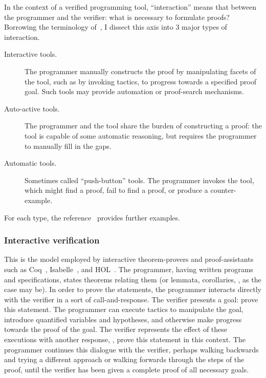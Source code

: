 In the context of a verified programming tool, ``interaction'' means that
between the programmer and the verifier: what is necessary to formulate proofs?
Borrowing the terminology of~\cite[\S 2]{Nelson_2019}, I dissect this axis into
3 major types of interaction.
\begin{description}
    \item[Interactive tools.] The programmer manually constructs the proof by
        manipulating facets of the tool, such as by invoking tactics, to
        progress towards a specified proof goal. Such tools may provide
        automation or proof-search mechanisms.
    \item[Auto-active tools.] The programmer and the tool share the burden of
        constructing a proof: the tool is capable of some automatic reasoning,
        but requires the programmer to manually fill in the gaps.
    \item[Automatic tools.] Sometimes called ``push-button'' tools. The
        programmer invokes the tool, which might find a proof, fail to find a
        proof, or produce a counter-example.
\end{description}

For each type, the reference~\cite{Nelson_2019} provides further examples.

\subsubsection{Interactive verification}

This is the model employed by interactive theorem-provers and proof-assistants
such as Coq~\cite{Coq}, Isabelle~\cite{Isabelle}, and HOL~\cite{HOL}. The
programmer, having written programs and specifications, states theorems relating
them (or lemmata, corollaries, \etc, as the case may be). In order to prove the
statements, the programmer interacts directly with the verifier in a sort of
call-and-response. The verifier presents a goal: prove this statement. The
programmer can execute tactics to manipulate the goal, introduce quantified
variables and hypotheses, and otherwise make progress towards the proof of the
goal. The verifier represents the effect of these executions with another
response, \eg, prove this statement in this context. The programmer continues
this dialogue with the verifier, perhaps walking backwards and trying a
different approach or walking forwards through the steps of the proof, until the
verifier has been given a complete proof of all necessary goals.

